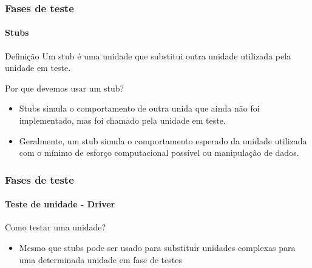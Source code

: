\begin{frame}
\frametitle{Fases de teste}
\framesubtitle{Stubs}
\label{concept:stub}

\begin{block:concept}{Definição}
Um stub é uma unidade que substitui outra unidade utilizada pela unidade em teste.
\end{block:concept}

\begin{block:fact}{Por que devemos usar um stub?}
\begin{itemize}
	\item Stubs simula o comportamento de outra unida que ainda não foi implementado, mas foi chamado pela unidade em teste.

	\item Geralmente, um stub simula o comportamento esperado da unidade utilizada com o mínimo de esforço computacional possível ou manipulação de dados.
\end{itemize}
\end{block:fact}

\hfill
{}
\end{frame}


\begin{frame}
\frametitle{Fases de teste}
\framesubtitle{Teste de unidade - Driver}

\begin{block:fact}{Como testar uma unidade?}
\begin{itemize}
	\item Mesmo que stubs pode ser usado para substituir unidades complexas para uma determinada unidade em fase de testes 
\end{itemize}
\end{block:fact}
\end{frame}



